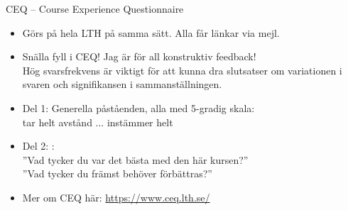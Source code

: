 

\begin{Slide}{CEQ -- Course Experience Questionnaire}\SlideFontSmall
\begin{itemize}
\item Görs på hela LTH på samma sätt. Alla får länkar via mejl.
\item Snälla fyll i CEQ! Jag är  för all konstruktiv feedback! \\ Hög svarsfrekvens är viktigt för att kunna dra slutsatser om variationen i svaren och signifikansen i sammanställningen.
\item Del 1: Generella påståenden, alla med 5-gradig skala: \\ tar helt avstånd ... instämmer helt
\item Del 2: : \\
''Vad  tycker  du  var  det  bästa  med  den här  kursen?'' \\
''Vad  tycker  du  främst  behöver  förbättras?''
\item Mer om CEQ här: \url{https://www.ceq.lth.se/}
\end{itemize}
\end{Slide}


